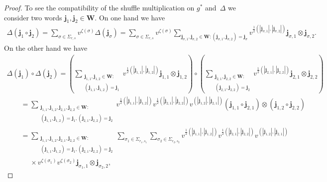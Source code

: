 \documentclass[pdftex]{sigma}
\numberwithin{equation}{section}
\begin{document}
\begin{proof}
To see the compatibility of the shuf\/f\/le multiplication on $g^*$ and~$\Delta$ we consider two words
$\mathbf{j}_1,\mathbf{j}_2\in\mathbf{W}$.
On one hand we have
\begin{gather*}
\Delta(\mathbf{j}_1\circ\mathbf{j}_2)=\sum\limits_{\sigma\in\Sigma_{r,s}}v^{\zeta(\sigma)}\Delta(\mathbf{j}_\sigma)
=\sum\limits_{\sigma\in\Sigma_{r,s}}v^{\zeta(\sigma)}
\sum\limits_{\mathbf{j}_{\sigma,1},\mathbf{j}_{\sigma,2}\in\mathbf{W}:(\mathbf{j}_{\sigma,1},\mathbf{j}_{\sigma,2})=\mathbf{j}_\sigma}
v^{\frac{1}{2}(|\mathbf{j}_{\sigma,1}|,|\mathbf{j}_{\sigma,2}|)}\mathbf{j}_{\sigma,1}\otimes\mathbf{j}_{\sigma,2}.
\end{gather*}
On the other hand we have
\begin{gather*}
\Delta(\mathbf{j}_1)\circ\Delta(\mathbf{j}_2)
=\left(\sum\limits_{\substack{\mathbf{j}_{1,1},\mathbf{j}_{1,2}\in\mathbf{W}:\\(\mathbf{j}_{1,1},\mathbf{j}_{1,2})=\mathbf{j}_1}}
v^{\frac{1}{2}(|\mathbf{j}_{1,1}|,|\mathbf{j}_{1,2}|)}\mathbf{j}_{1,1}\otimes\mathbf{j}_{1,2}\right)\!
\circ\!\left(\sum\limits_{\substack{\mathbf{j}_{2,1},\mathbf{j}_{2,2}\in\mathbf{W}:\\(\mathbf{j}_{2,1},\mathbf{j}_{2,2})=\mathbf{j}_2}}
v^{\frac{1}{2}(|\mathbf{j}_{2,1}|,|\mathbf{j}_{2,2}|)}\mathbf{j}_{2,1}\otimes\mathbf{j}_{2,2}\right)
\\
\qquad
=\sum\limits_{\substack{\mathbf{j}_{1,1},\mathbf{j}_{1,2},\mathbf{j}_{2,1},\mathbf{j}_{2,2}\in\mathbf{W}:\\
(\mathbf{j}_{1,1},\mathbf{j}_{1,2})=\mathbf{j}_1,(\mathbf{j}_{2,1},\mathbf{j}_{2,2})=\mathbf{j}_2}}
v^{\frac{1}{2}(|\mathbf{j}_{1,1}|,|\mathbf{j}_{1,2}|)}v^{\frac{1}{2}(|\mathbf{j}_{2,1}|,|\mathbf{j}_{2,2}|)}
v^{(|\mathbf{j}_{1,2}|,|\mathbf{j}_{2,1}|)}(\mathbf{j}_{1,1}\circ\mathbf{j}_{2,1})\otimes(\mathbf{j}_{1,2}\circ\mathbf{j}_{2,2})
\\
\qquad
=\sum\limits_{\substack{\mathbf{j}_{1,1},\mathbf{j}_{1,2},\mathbf{j}_{2,1},\mathbf{j}_{2,2}\in\mathbf{W}:\\
(\mathbf{j}_{1,1},\mathbf{j}_{1,2})=\mathbf{j}_1,(\mathbf{j}_{2,1},\mathbf{j}_{2,2})=\mathbf{j}_2}}
\sum\limits_{\sigma_1\in\Sigma_{r_1,s_1}}
\sum\limits_{\sigma_2\in\Sigma_{r_2,s_2}}v^{\frac{1}{2}(|\mathbf{j}_{1,1}|,|\mathbf{j}_{1,2}|)}
v^{\frac{1}{2}(|\mathbf{j}_{2,1}|,|\mathbf{j}_{2,2}|)}v^{(|\mathbf{j}_{1,2}|,|\mathbf{j}_{2,1}|)}
\\
\qquad\phantom{=}  \times
v^{\zeta(\sigma_1)}v^{\zeta(\sigma_2)}\mathbf{j}_{\sigma_1,1}\otimes\mathbf{j}_{\sigma_2,2},

\end{gather*}
\end{proof}
\end{document}
